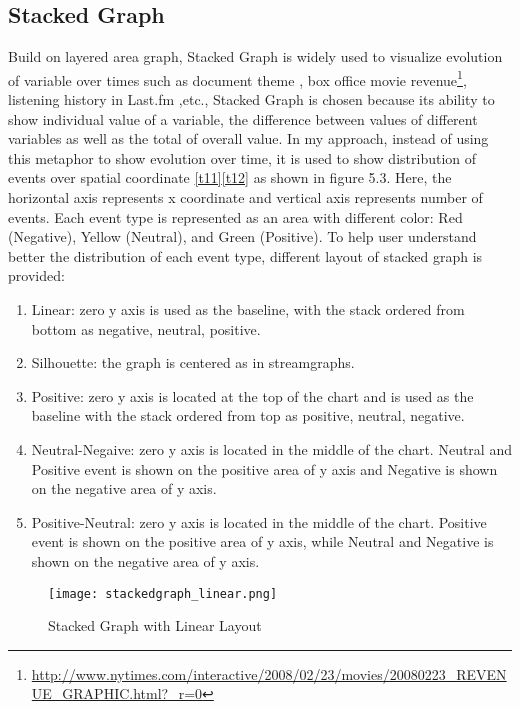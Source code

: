 \subsection{Stacked Graph}
Build on layered area graph, Stacked Graph is widely used to visualize evolution of variable over times such as document theme \cite{havre}, box office movie revenue\footnote{\url{http://www.nytimes.com/interactive/2008/02/23/movies/20080223_REVENUE_GRAPHIC.html?_r=0}}, listening history in Last.fm \cite{byron},etc., Stacked Graph is chosen because its ability to show individual value of a variable, the difference between values of different variables as well as the total of overall value. In my approach, instead of using this metaphor to show evolution over time, it is used to show distribution of events over spatial coordinate \ref{t11}\ref{t12} as shown in figure 5.3. Here, the horizontal axis represents x coordinate and vertical axis represents number of events. Each event type is represented as an area with different color: Red (Negative), Yellow (Neutral), and Green (Positive). To help user understand better the distribution of each event type, different layout of stacked graph is provided: 
\begin{enumerate}
  \item Linear: zero y axis is used as the baseline, with the stack ordered from bottom as negative, neutral, positive.
  \item Silhouette: the graph is centered as in streamgraphs.
  \item Positive: zero y axis is located at the top of the chart and is used as the baseline with the stack ordered from top as positive, neutral, negative.
  \item Neutral-Negaive: zero y axis is located in the middle of the chart. Neutral and Positive event is shown on the positive area of y axis and Negative is shown on the negative area of y axis.
  \item Positive-Neutral: zero y axis is located in the middle of the chart. Positive event is shown on the positive area of y axis, while Neutral and Negative is shown on the negative area of y axis.
\end{enumerate}

\begin{figure}
\centering
\texttt{[image: stackedgraph\_linear.png]}
\caption{Stacked Graph with Linear Layout}
\end{figure}

